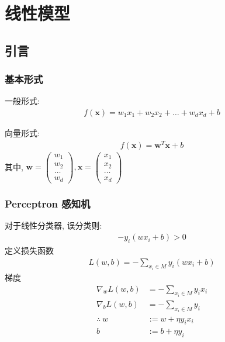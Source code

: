 \newpage
\section{线性模型}%

\subsection{引言}
\subsubsection{基本形式}
一般形式:
\begin{align*}
    f(\bm{x})=w_1x_1+w_2x_2+\dots+w_dx_d+b
\end{align*}

向量形式:
\begin{align*}
    f(\bm{x})=\bm w ^T \bm x+b
\end{align*}
其中, $\bm w=\begin{pmatrix}
    w_1 \\w_2\\ \dots \\ w_d
\end{pmatrix}, \bm x=\begin{pmatrix}
    x_1 \\x_2\\ \dots \\ x_d
\end{pmatrix}$

\subsubsection{Perceptron 感知机}
对于线性分类器, 误分类则:
\begin{align*}
    -y_i(wx_i+b)>0
\end{align*}
定义损失函数 
\begin{align*}
    L(w,b)=-\sum_{x_i\in M}y_i(wx_i+b)
\end{align*}
梯度
\begin{align*}
    \nabla_w L(w,b)&=-\sum_{x_i\in M}y_ix_i\\
    \nabla_b L(w,b)&=-\sum_{x_i\in M}y_i\\
    \therefore\ w&:=w+\eta y_ix_i\\
    b&:= b+\eta y_i
\end{align*}

